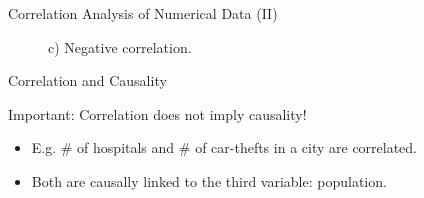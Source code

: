 \begin{frame}{Correlation Analysis of Numerical Data (II)}
\begin{itemize}
\begin{figure}[H]
			      \begin{minipage}{0.32\textwidth}
				      \centering
				      \caption{c) Negative correlation.}
			      \end{minipage}\hfill
		      \end{figure}
	\end{itemize}
\end{frame}

\begin{frame}{Correlation and Causality}


	\vspace{5mm}
	\begin{alertblock}{Important: Correlation does not imply causality!}
		\begin{itemize}
			\item E.g. $\#$ of hospitals and $\#$ of car-thefts in a city
			      are correlated.
			\item Both are causally linked to the third variable:
			      population.
		\end{itemize}
	\end{alertblock}

\end{frame}


